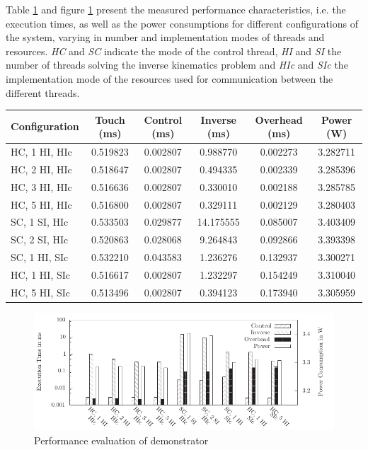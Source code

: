 Table \ref{tab:demo_perf} and figure \ref{fig:demo_perf} present the measured
performance characteristics, i.e. the execution times, as well as the power
consumptions for different configurations of the system, varying in number and
implementation modes of threads and resources. \emph{HC} and \emph{SC}
indicate the mode of the control thread, \emph{HI} and \emph{SI} the number of
threads solving the inverse kinematics problem and \emph{HIc} and \emph{SIc}
the implementation mode of the resources used for communication between the
different threads.
\begin{table}
	\scriptsize
	\centering
	\label{tab:demo_perf}
	\begin{tabular}{lccccc}
	\hline
	\textbf{Configuration} & \textbf{Touch (ms)} & \textbf{Control (ms)} & \textbf{Inverse (ms)} & \textbf{Overhead (ms)} & \textbf{Power (W)}\\
	\hline
	HC, 1 HI, HIc & 0.519823 & 0.002807 & 0.988770 & 0.002273 & 3.282711\\
	HC, 2 HI, HIc & 0.518647 & 0.002807 & 0.494335 & 0.002339 & 3.285396\\
	HC, 3 HI, HIc & 0.516636 & 0.002807 & 0.330010 & 0.002188 & 3.285785\\
	HC, 5 HI, HIc & 0.516800 & 0.002807 & 0.329111 & 0.002129 & 3.280403\\
	SC, 1 SI, HIc & 0.533503 & 0.029877 & 14.175555 & 0.085007 & 3.403409\\
	SC, 2 SI, HIc & 0.520863 & 0.028068 & 9.264843 & 0.092866 & 3.393398\\
	SC, 1 HI, SIc & 0.532210 & 0.043583 & 1.236276 & 0.132937 & 3.300271\\
	HC, 1 HI, SIc & 0.516617 & 0.002807 & 1.232297 & 0.154249 & 3.310040\\
	HC, 5 HI, SIc & 0.513496 & 0.002807 & 0.394123 & 0.173940 & 3.305959\\
	\hline
	\end{tabular}
\end{table}
\begin{figure}
	\centering
	\includegraphics{../figures/demo_perf}
	\caption{Performance evaluation of demonstrator}
	\label{fig:demo_perf}
\end{figure}
